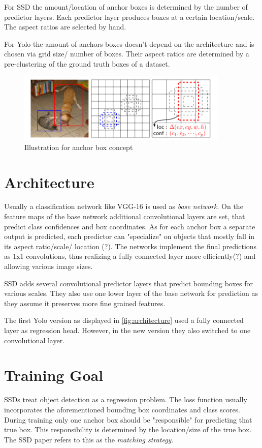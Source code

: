 \documentclass{article}
\begin{document}
For SSD the amount/location of anchor boxes is determined by the number of predictor layers. Each predictor layer produces boxes at a certain location/scale. The aspect ratios are selected by hand. 

For Yolo the amount of anchors boxes doesn't depend on the architecture and is chosen via grid size/ number of boxes. Their aspect ratios are determined by a pre-clustering of the ground truth boxes of a dataset.
\begin{figure}[h]
	\centering
	\includegraphics[width=0.9\textwidth]{fig/anchors}
	\caption{Illustration for anchor box concept \cite{ssd}}
	\label{fig:anchors}
\end{figure}
\section{Architecture}

Usually a classification network like VGG-16 is used as \textit{base network}. On the feature maps of the base network additional convolutional layers are set, that predict class confidences and box coordinates. As for each anchor box a separate output is predicted, each predictor can "specialize" on objects that mostly fall in its aspect ratio/scale/ location (?). The networks implement the final predictions as 1x1 convolutions, thus realizing a fully connected layer more efficiently(?) and allowing various image sizes.

SSD adds several convolutional predictor layers that predict bounding boxes for various scales. They also use one lower layer of the base network for prediction as they assume it preserves more fine grained features.

The first Yolo version as displayed in \autoref{fig:architecture} used a fully connected layer as regression head. However, in the new version they also switched to one convolutional layer.

\section{Training Goal}
SSDs treat object detection as a regression problem. The loss function usually incorporates the aforementioned bounding box coordinates and class scores. During training only one anchor box should be "responsible" for predicting that true box. This responsibility is determined by the location/size of the true box. The SSD paper refers to this as the \textit{matching strategy}.
\end{document}
